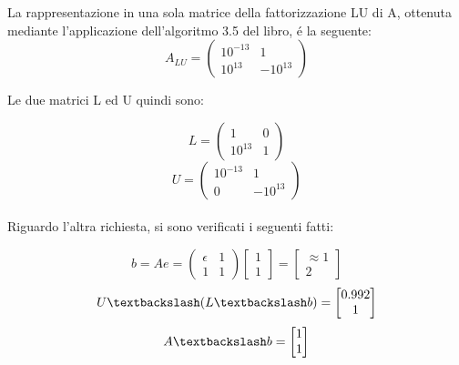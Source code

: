 \begin{center}
\footnotesize\noindent{}\end{center}

\noindent La rappresentazione in una sola matrice della fattorizzazione LU di A, ottenuta mediante l'applicazione dell'algoritmo 3.5 del libro, \'e la seguente:
\[
A_{LU} = \begin{pmatrix} 10^{-13} & 1 \\ 10^{13} & -10^{13}\end{pmatrix}
\]

\noindent Le due matrici L ed U quindi sono:

\[
L = \begin{pmatrix} 1 & 0 \\ 10^{13} & 1\end{pmatrix}\]
\[
U = \begin{pmatrix} 10^{-13} & 1 \\ 0 & -10^{13}\end{pmatrix}
\]
\\
\noindent Riguardo l'altra richiesta, si sono verificati i seguenti fatti:

\[
b = Ae = \begin{pmatrix} \epsilon & 1 \\ 1 & 1 \end{pmatrix} \begin{bmatrix} 1 \\ 1\end{bmatrix} = \begin{bmatrix} \approx 1 \\ 2 \end{bmatrix}
\]
\[
U \textbackslash (L \textbackslash b) = \begin{bmatrix} 0.992 \\ 1\end{bmatrix}
\]
\[
A \textbackslash b = \begin{bmatrix} 1 \\ 1\end{bmatrix}
\]


